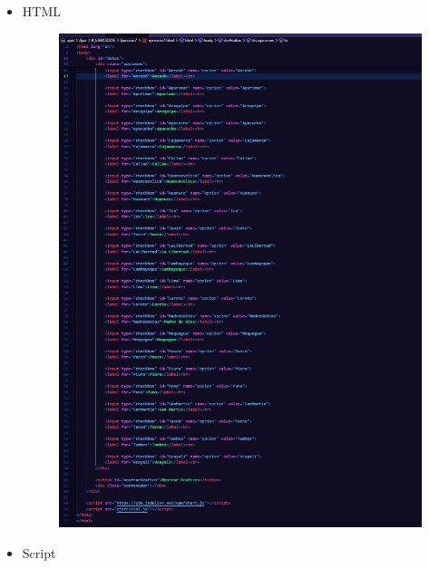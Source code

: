 \documentclass{article}
\begin{document}
	\begin{itemize}
		\item HTML
		\begin{figure}[H]
			\centering
			\includegraphics[width=1.0\textwidth,keepaspectratio]{img/Ejer7T2HTML.jpg}
		\end{figure}
		\item Script
		\begin{figure}[H]
			\centering

\end{figure}
\end{itemize}
\end{document}
